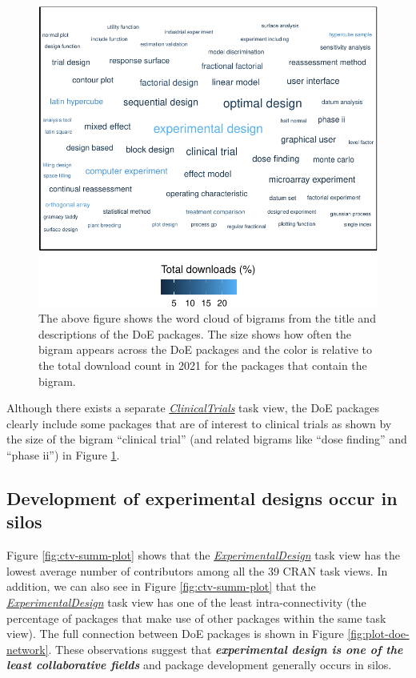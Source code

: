 \documentclass{article}
\begin{document}
\begin{figure}[htbp]

{\centering \includegraphics{figures/wordcloud-over-time-1} 

}

\caption{The above figure shows the word cloud of bigrams from the title and descriptions of the DoE packages. The size shows how often the bigram appears across the DoE packages and the color is relative to the total download count in 2021 for the packages that contain the bigram.}\label{fig:wordcloud-over-time}
\end{figure}

Although there exists a separate
\href{http://CRAN.R-project.org/view=ClinicalTrials}{\emph{ClinicalTrials}}
task view, the DoE packages clearly include some packages that are of
interest to clinical trials as shown by the size of the bigram
``clinical trial'' (and related bigrams like ``dose finding'' and
``phase ii'') in Figure \ref{fig:wordcloud-over-time}.

\hypertarget{development-of-experimental-designs-occur-in-silos}{%
\subsection{Development of experimental designs occur in
silos}\label{development-of-experimental-designs-occur-in-silos}}

Figure \ref{fig:ctv-summ-plot} shows that the
\href{http://CRAN.R-project.org/view=ExperimentalDesign}{\emph{ExperimentalDesign}}
task view has the lowest average number of contributors among all the 39
CRAN task views. In addition, we can also see in Figure
\ref{fig:ctv-summ-plot} that the
\href{http://CRAN.R-project.org/view=ExperimentalDesign}{\emph{ExperimentalDesign}}
task view has one of the least intra-connectivity (the percentage of
packages that make use of other packages within the same task view). The
full connection between DoE packages is shown in Figure
\ref{fig:plot-doe-network}. These observations suggest that
\textbf{\emph{experimental design is one of the least collaborative
fields}} and package development generally occurs in silos.
\end{document}
